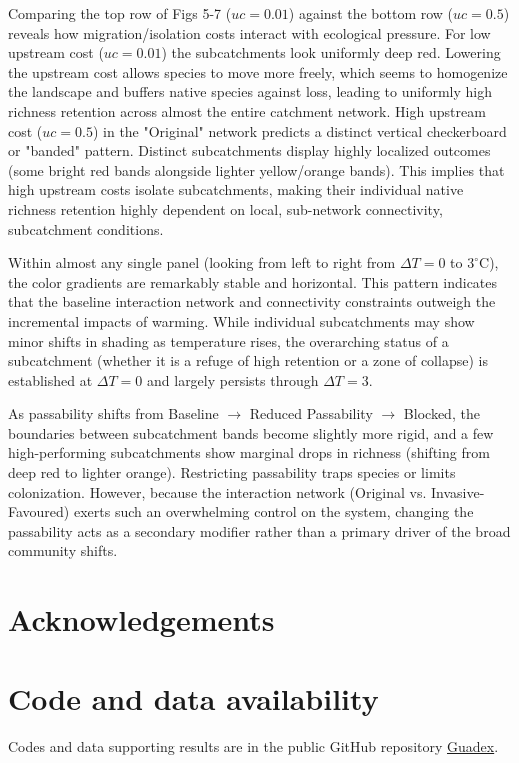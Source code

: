 \documentclass[11pt,a4paper]{article}
\begin{document}
{Comparing the top row of Figs 5-7 ($uc=0.01$) against the bottom row ($uc=0.5$) reveals how migration/isolation costs interact with ecological pressure.
For low upstream cost ($uc=0.01$) the subcatchments look uniformly deep red. Lowering the upstream cost allows species to move more freely, which seems to homogenize the landscape and buffers native species against loss, leading to uniformly high richness retention across almost the entire catchment network. High upstream cost ($uc=0.5$) in the "Original" network predicts a distinct vertical checkerboard or "banded" pattern. Distinct subcatchments display highly localized outcomes (some bright red bands alongside lighter yellow/orange bands). This implies that high upstream costs isolate subcatchments, making their individual native richness retention highly dependent on local, sub-network connectivity, subcatchment conditions. 

Within almost any single panel (looking from left to right from $\Delta T = 0$ to $3^\circ\text{C}$), the color gradients are remarkably stable and horizontal. This pattern indicates that the baseline interaction network and connectivity constraints outweigh the incremental impacts of warming. While individual subcatchments may show minor shifts in shading as temperature rises, the overarching status of a subcatchment (whether it is a refuge of high retention or a zone of collapse) is established at $\Delta T=0$ and largely persists through $\Delta T=3$.

As passability shifts from Baseline $\rightarrow$ Reduced Passability $\rightarrow$ Blocked, the boundaries between subcatchment bands become slightly more rigid, and a few high-performing subcatchments show marginal drops in richness (shifting from deep red to lighter orange). Restricting passability traps species or limits colonization. However, because the interaction network (Original vs. Invasive-Favoured) exerts such an overwhelming control on the system, changing the passability acts as a secondary modifier rather than a primary driver of the broad community shifts.


\section{Acknowledgements}

\section{Code and data availability}
Codes and data supporting results are in the public GitHub repository \href{https://github.com/melian009/GuadeX.git}{Guadex}.



}
\end{document}
